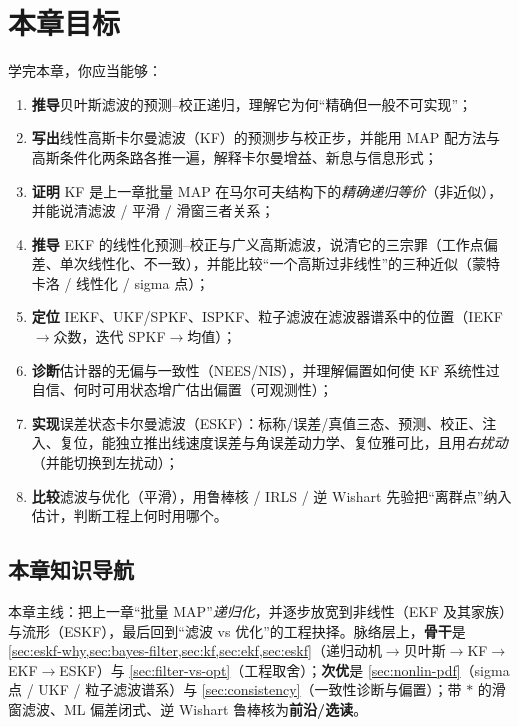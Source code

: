 \section*{本章目标}
学完本章，你应当能够：
\begin{enumerate}
  \item \textbf{推导}贝叶斯滤波的预测–校正递归，理解它为何“精确但一般不可实现”；
  \item \textbf{写出}线性高斯卡尔曼滤波（KF）的预测步与校正步，并能用 MAP 配方法与高斯条件化两条路各推一遍，解释卡尔曼增益、新息与信息形式；
  \item \textbf{证明} KF 是上一章批量 MAP 在马尔可夫结构下的\emph{精确递归等价}（非近似），并能说清滤波 / 平滑 / 滑窗三者关系；
  \item \textbf{推导} EKF 的线性化预测–校正与广义高斯滤波，说清它的三宗罪（工作点偏差、单次线性化、不一致），并能比较“一个高斯过非线性”的三种近似（蒙特卡洛 / 线性化 / sigma 点）；
  \item \textbf{定位} IEKF、UKF/SPKF、ISPKF、粒子滤波在滤波器谱系中的位置（IEKF$\to$众数，迭代 SPKF$\to$均值）；
  \item \textbf{诊断}估计器的无偏与一致性（NEES/NIS），并理解偏置如何使 KF 系统性过自信、何时可用状态增广估出偏置（可观测性）；
  \item \textbf{实现}误差状态卡尔曼滤波（ESKF）：标称/误差/真值三态、预测、校正、注入、复位，能独立推出线速度误差与角误差动力学、复位雅可比，且用\emph{右扰动}（并能切换到左扰动）；
  \item \textbf{比较}滤波与优化（平滑），用鲁棒核 / IRLS / 逆 Wishart 先验把“离群点”纳入估计，判断工程上何时用哪个。
\end{enumerate}

\subsection*{本章知识导航}
本章主线：把上一章“批量 MAP”\emph{递归化}，并逐步放宽到非线性（EKF 及其家族）与流形（ESKF），最后回到“滤波 vs 优化”的工程抉择。脉络层上，\textbf{骨干}是 \cref{sec:eskf-why,sec:bayes-filter,sec:kf,sec:ekf,sec:eskf}（递归动机$\to$贝叶斯$\to$KF$\to$EKF$\to$ESKF）与 \cref{sec:filter-vs-opt}（工程取舍）；\textbf{次优}是 \cref{sec:nonlin-pdf}（sigma 点 / UKF / 粒子滤波谱系）与 \cref{sec:consistency}（一致性诊断与偏置）；带 $*$ 的滑窗滤波、ML 偏差闭式、逆 Wishart 鲁棒核为\textbf{前沿/选读}。

